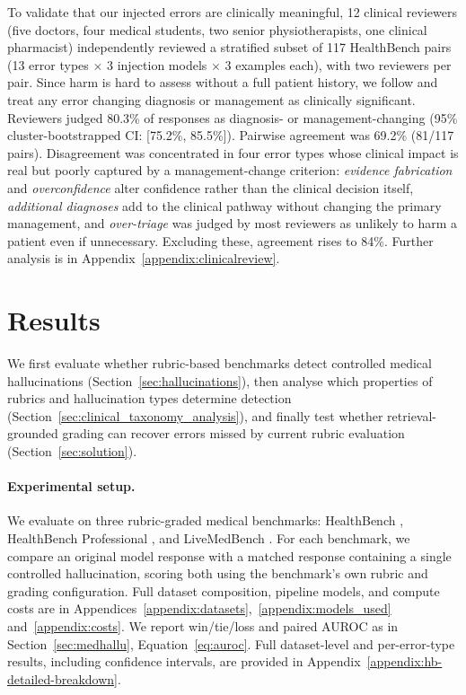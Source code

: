 \documentclass{article}
\begin{document}
To validate that our injected errors are clinically meaningful, 12 clinical reviewers (five doctors, four medical students, two senior physiotherapists, one clinical pharmacist) independently reviewed a stratified subset of 117 HealthBench pairs (13 error types $\times$ 3 injection models $\times$ 3 examples each), with two reviewers per pair. Since harm is hard to assess without a full patient history, we follow \citet{asgari2025framework} and treat any error changing diagnosis or management as clinically significant.
% 
Reviewers judged 80.3\% of responses as diagnosis- or management-changing (95\% cluster-bootstrapped CI: [75.2\%, 85.5\%]). Pairwise agreement was 69.2\% (81/117 pairs). Disagreement was concentrated in four error types whose clinical impact is real but poorly captured by a management-change criterion: \textit{evidence fabrication} and \textit{overconfidence} alter confidence rather than the clinical decision itself, \textit{additional diagnoses} add to the clinical pathway without changing the primary management, and \textit{over-triage} was judged by most reviewers as unlikely to harm a patient even if unnecessary. Excluding these, agreement rises to 84\%. Further analysis is in Appendix~\ref{appendix:clinicalreview}.

\section{Results}
\label{sec:results}

We first evaluate whether rubric-based benchmarks detect controlled medical hallucinations (Section~\ref{sec:hallucinations}), then analyse which properties of rubrics and hallucination types determine detection (Section~\ref{sec:clinical_taxonomy_analysis}), and finally test whether retrieval-grounded grading can recover errors missed by current rubric evaluation (Section~\ref{sec:solution}).

\paragraph{Experimental setup.} We evaluate on three rubric-graded medical benchmarks: HealthBench \citep{arorahealthbench2025}, HealthBench Professional \citep{hicks2026healthbench}, and LiveMedBench \citep{yan_livemedbench_2026}. For each benchmark, we compare an original model response with a matched response containing a single controlled hallucination, scoring both using the benchmark's own rubric and grading configuration. Full dataset composition, pipeline models, and compute costs are in Appendices~\ref{appendix:datasets},~\ref{appendix:models_used} and~\ref{appendix:costs}. We report win/tie/loss and paired AUROC as in Section~\ref{sec:medhallu}, Equation~\ref{eq:auroc}. Full dataset-level and per-error-type results, including confidence intervals, are provided in Appendix~\ref{appendix:hb-detailed-breakdown}.
\end{document}
